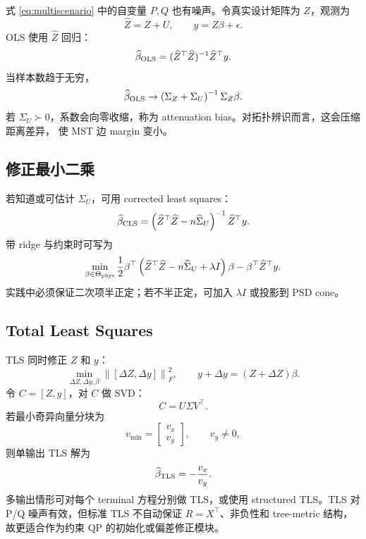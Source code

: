 \documentclass[UTF8,11pt]{ctexart}
\newcommand{\norm}[1]{\left\lVert #1 \right\rVert}
\begin{document}
式 \eqref{eq:multiscenario} 中的自变量 $P,Q$ 也有噪声。令真实设计矩阵为 $Z$，观测为
\[
    \widehat Z=Z+U,\qquad y=Z\beta+\epsilon.
\]
OLS 使用 $\widehat Z$ 回归：
\[
    \widehat\beta_{\rm OLS}
    =
    (\widehat Z^\top \widehat Z)^{-1}\widehat Z^\top y.
\]
当样本数趋于无穷，
\begin{equation}
    \widehat\beta_{\rm OLS}
    \rightarrow
    \left(\Sigma_Z+\Sigma_U\right)^{-1}\Sigma_Z\beta.
    \label{eq:attenuation}
\end{equation}
若 $\Sigma_U\succ0$，系数会向零收缩，称为 attenuation bias。对拓扑辨识而言，这会压缩距离差异，
使 MST 边 margin 变小。

\subsection{修正最小二乘}

若知道或可估计 $\Sigma_U$，可用 corrected least squares：
\begin{equation}
    \widehat\beta_{\rm CLS}
    =
    \left(\widehat Z^\top\widehat Z-n\widehat\Sigma_U\right)^{-1}
    \widehat Z^\top y.
    \label{eq:cls}
\end{equation}
带 ridge 与约束时可写为
\begin{equation}
    \min_{\beta\in\Theta_{\rm phys}}
    \frac12\beta^\top
    \left(\widehat Z^\top\widehat Z-n\widehat\Sigma_U+\lambda I\right)
    \beta
    -
    \beta^\top \widehat Z^\top y.
    \label{eq:cls-constrained}
\end{equation}
实践中必须保证二次项半正定；若不半正定，可加入 $\lambda I$ 或投影到 PSD cone。

\subsection{Total Least Squares}

TLS 同时修正 $Z$ 和 $y$：
\begin{equation}
    \min_{\Delta Z,\Delta y,\beta}
    \norm{[\Delta Z,\Delta y]}_F^2,
    \qquad
    y+\Delta y=(Z+\Delta Z)\beta.
    \label{eq:tls}
\end{equation}
令 $C=[Z,y]$，对 $C$ 做 SVD：
\[
    C=U\Sigma V^\top.
\]
若最小奇异向量分块为
\[
    v_{\min}=\begin{bmatrix}v_x\\v_y\end{bmatrix},\qquad v_y\neq0,
\]
则单输出 TLS 解为
\begin{equation}
    \widehat\beta_{\rm TLS}=-\frac{v_x}{v_y}.
    \label{eq:tls-svd}
\end{equation}
多输出情形可对每个 terminal 方程分别做 TLS，或使用 structured TLS。TLS 对 P/Q 噪声有效，但标准 TLS 不自动保证
$R=X^\top$、非负性和 tree-metric 结构，故更适合作为约束 QP 的初始化或偏差修正模块。
\end{document}

